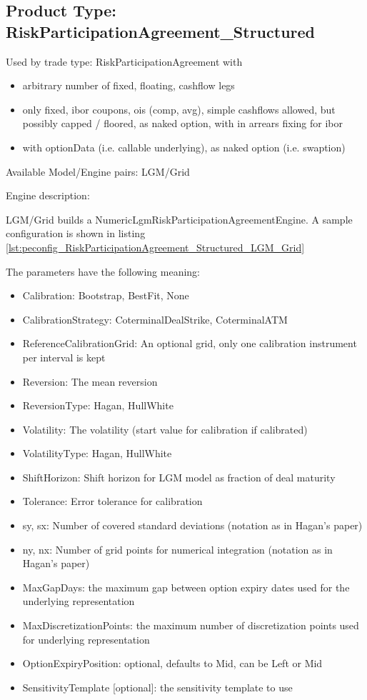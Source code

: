 \subsection{Product Type: RiskParticipationAgreement\_Structured}

Used by trade type: RiskParticipationAgreement with

\begin{itemize}
\item arbitrary number of fixed, floating, cashflow legs
\item only fixed, ibor coupons, ois (comp, avg), simple cashflows allowed, but possibly capped / floored,
  as naked option, with in arrears fixing for ibor
\item with optionData (i.e. callable underlying), as naked option (i.e. swaption)
\end{itemize}

Available Model/Engine pairs: LGM/Grid

Engine description:

LGM/Grid builds a NumericLgmRiskParticipationAgreementEngine. A sample configuration is shown in listing
\ref{lst:peconfig_RiskParticipationAgreement_Structured_LGM_Grid}

The parameters have the following meaning:

\begin{itemize}
\item Calibration: Bootstrap, BestFit, None
\item CalibrationStrategy: CoterminalDealStrike, CoterminalATM
\item ReferenceCalibrationGrid: An optional grid, only one calibration instrument per interval is kept
\item Reversion: The mean reversion
\item ReversionType: Hagan, HullWhite
\item Volatility: The volatility (start value for calibration if calibrated)
\item VolatilityType: Hagan, HullWhite
\item ShiftHorizon: Shift horizon for LGM model as fraction of deal maturity
\item Tolerance: Error tolerance for calibration
\item sy, sx: Number of covered standard deviations (notation as in Hagan's paper)
\item ny, nx: Number of grid points for numerical integration (notation as in Hagan's paper)
\item MaxGapDays: the maximum gap between option expiry dates used for the underlying representation
\item MaxDiscretizationPoints: the maximum number of discretization points used for underlying representation
\item OptionExpiryPosition: optional, defaults to Mid, can be Left or Mid
\item SensitivityTemplate [optional]: the sensitivity template to use
\end{itemize}

